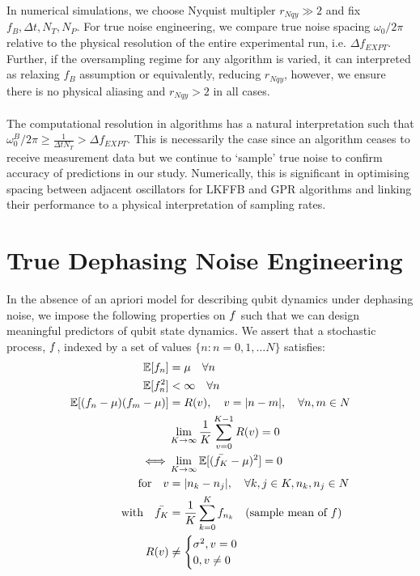 In numerical simulations, we choose  Nyquist multipler $r_{Nqy} \gg 2$ and fix $f_B, \Delta t, N_T, N_P$. For true noise engineering, we compare true noise spacing $\omega_0/ 2\pi$ relative to the physical resolution of the entire experimental run, i.e. $\Delta f_{EXPT}$. Further, if the oversampling regime for any algorithm is varied, it can interpreted as relaxing $f_B$ assumption or equivalently, reducing $r_{Nqy}$, however, we ensure there is no physical aliasing and $r_{Nqy}>2$ in all cases.
\\
\\
The computational resolution in algorithms has a natural interpretation such that  $\omega_0^B / 2\pi \geq \frac{1}{\Delta t N_T} > \Delta f_{EXPT}$. This is necessarily the case since an algorithm ceases to receive measurement data but we continue to `sample' true noise to confirm accuracy of predictions in our study. Numerically, this is significant in optimising spacing between adjacent oscillators for  LKFFB and GPR algorithms and linking their performance to a physical interpretation of sampling rates.  

\section{True Dephasing Noise Engineering \label{sec:app:truenoise}} 
In the absence of an apriori model for describing qubit dynamics under dephasing noise, we impose the following properties on $f$ such that we can design meaningful predictors of qubit state dynamics. We assert that a stochastic process, $f$, indexed by a set of values $\{ n : n = 0, 1, \hdots N \}$ satisfies: 
\begin{align}
\mathbb{E}[f_n] &= \mu \quad \forall n \label{eqn:app:f_mean} \\
\mathbb{E}[f_n^2] & < \infty \quad \forall n \label{eqn:app:f_var} \\
\mathbb{E}[(f_n - \mu)(f_m - \mu)] &= R(v), \quad  v = |n-m|, \quad \forall n, m \in N  \label{eqn:app:f_covar} \\
& \lim_{K \to \infty} \frac{1}{K} \sum_{v=0}^{K-1} R(v) = 0 \nonumber \\
\iff & \lim_{K \to \infty} \mathbb{E}[(\bar{f_K} - \mu)^2] = 0 \nonumber \\
\text{for} \quad v &= |n_k - n_j|, \quad \forall k,j \in K, n_k, n_j \in N  \nonumber \\
\text{with} \quad \bar{f_K} &= \frac{1}{K} \sum_{k=0}^K f_{n_k} \quad \text{(sample mean of $f$)}  \label{eqn:app:f_msergodic}  \\ 
R(v) & \neq \begin{cases} \sigma^2 , v = 0 \\ 0, v\neq 0 \end{cases} \label{eqn:app:f_Markovian}
\end{align}

